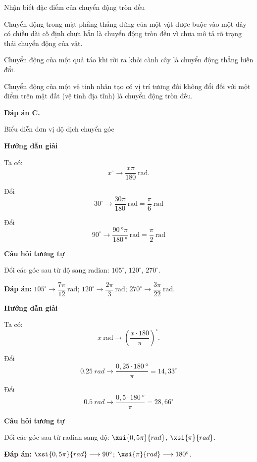 \begin{dang}{Nhận biết đặc điểm của  chuyển động tròn đều}
{Chuyển động trong mặt phẳng thẳng đứng của một vật được buộc vào một dây có chiều dài cố định chưa hẳn là chuyển động tròn đều vì chưa mô tả rõ trạng thái chuyển động của vật.

Chuyển động của một quả táo khi rời ra khỏi cành cây là chuyển động thẳng biến đổi.

Chuyển động của một vệ tinh nhân tạo có vị trí tương đối không đổi đối với một điểm trên mặt đất (vệ tinh địa tĩnh) là chuyển động tròn đều.

\textbf{Đáp án C.}


}
	
\end{dang}
\begin{dang}{Biểu diễn đơn vị độ dịch chuyển góc}
	{	\begin{center}
			\textbf{Hướng dẫn giải}
		\end{center}
		
		Ta có:
		$$x^\circ \longrightarrow \dfrac{x \pi}{180}\ \text{rad}.$$
		
		Đổi $$30^\circ \longrightarrow \dfrac{30\pi}{180}\ \text{rad} = \dfrac{\pi}{6}\ \text{rad}$$
		
		Đổi $$90^\circ \longrightarrow \dfrac{\SI{90}{\degree}\pi}{\SI{180}{\degree}}\ \text{rad} = \dfrac{\pi}{2}\ \text{rad}$$
		
		\begin{center}
			\textbf{Câu hỏi tương tự}
		\end{center}
		
		Đổi các góc sau từ độ sang radian: $105^\circ$, $120^\circ$, $270^\circ$.
		
		\textbf{Đáp án:} $105^\circ \longrightarrow \dfrac{7\pi}{12}\ \text{rad}$; $120^\circ \longrightarrow \dfrac{2\pi}{3}\ \text{rad}$; $270^\circ \longrightarrow \dfrac{3\pi}{22}\ \text{rad}$.
	}
	{	\begin{center}
			\textbf{Hướng dẫn giải}
		\end{center}
		
		Ta có:
		$$x\ \text{rad} \longrightarrow \left(\dfrac{x \cdot 180}{\pi}\right)^\circ.$$
		
		Đổi $$\SI{0.25}{rad} \longrightarrow \dfrac{0,25 \cdot \SI{180}{\degree}}{\pi} = 14,33^\circ$$
		
		Đổi $$\SI{0.5}{rad} \longrightarrow \dfrac{0,5 \cdot \SI{180}{\degree}}{\pi} = 28,66^\circ$$
		
		\begin{center}
			\textbf{Câu hỏi tương tự}
		\end{center}
		
		Đổi các góc sau từ radian sang độ: $\xsi{0,5\pi}{rad}$, $\xsi{\pi}{rad}$.
		
		\textbf{Đáp án:} $\xsi{0,5\pi}{rad} \longrightarrow 90^\circ$; $\xsi{\pi}{rad} \longrightarrow 180^\circ$.
	}
\end{dang}
